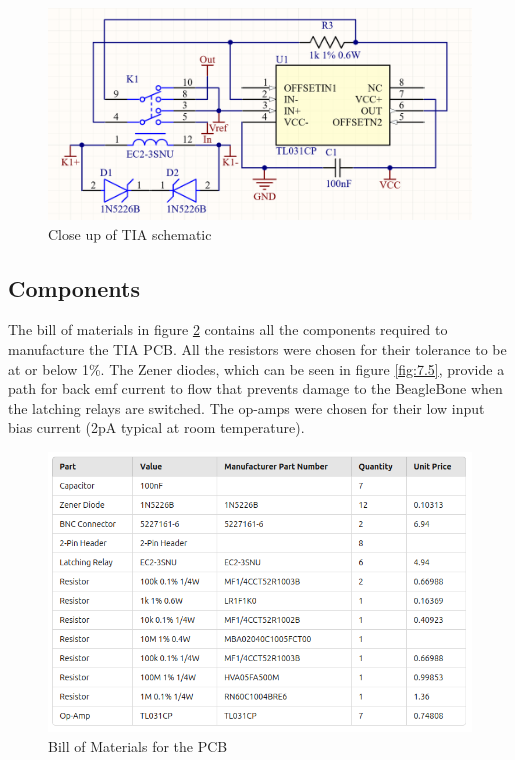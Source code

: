 \documentclass[conference]{IEEEtran}
\begin{document}
\begin{figure}
    \centering
    \includegraphics[width=0.8\linewidth]{IndividualTIASchematic.png}
    \caption{Close up of TIA schematic}
    \label{fig:5}
\end{figure}

\subsection{Components}

The bill of materials in figure \ref{fig:6} contains all the components required to manufacture the TIA PCB. All the resistors were chosen for their tolerance to be at or below 1\%. The Zener diodes, which can be seen in figure \ref{fig:7.5}, provide a path for back emf current to flow that prevents damage to the BeagleBone when the latching relays are switched. The op-amps were chosen for their low input bias current (2pA typical at room temperature). 

\begin{figure}
    \centering
    \includegraphics[width=\linewidth]{BOMcropped.png}
    \caption{Bill of Materials for the PCB}
    \label{fig:6}
\end{figure}
\end{document}
